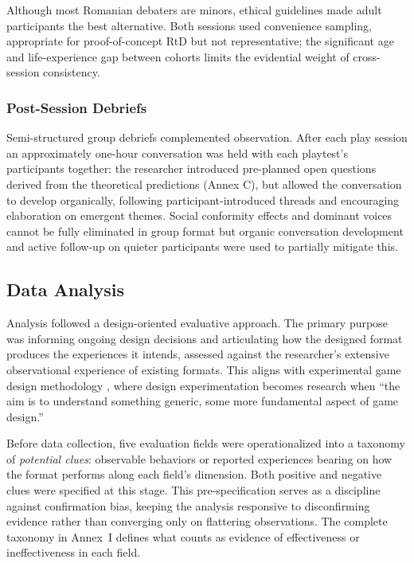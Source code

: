 Although most Romanian debaters are minors, ethical guidelines made adult participants the best alternative. Both sessions used convenience sampling, appropriate for proof-of-concept RtD but not representative; the significant age and life-experience gap between cohorts limits the evidential weight of cross-session consistency.

\subsubsection{Post-Session Debriefs}

Semi-structured group debriefs complemented observation. After each play session an approximately one-hour conversation was held with each playtest's participants together: the researcher introduced pre-planned open questions derived from the theoretical predictions (Annex C), but allowed the conversation to develop organically, following participant-introduced threads and encouraging elaboration on emergent themes. Social conformity effects and dominant voices cannot be fully eliminated in group format but organic conversation development and active follow-up on quieter participants were used to partially mitigate this.

\subsection{Data Analysis}

Analysis followed a design-oriented evaluative approach. The primary purpose was informing ongoing design decisions and articulating how the designed format produces the experiences it intends, assessed against the researcher's extensive observational experience of existing formats. This aligns with experimental game design methodology \parencite{waern2015experimental}, where design experimentation becomes research when ``the aim is to understand something generic, some more fundamental aspect of game design.''

Before data collection, five evaluation fields were operationalized into a taxonomy of \textit{potential clues}: observable behaviors or reported experiences bearing on how the format performs along each field's dimension. Both positive and negative clues were specified at this stage. This pre-specification serves as a discipline against confirmation bias, keeping the analysis responsive to disconfirming evidence rather than converging only on flattering observations. The complete taxonomy in Annex~I defines what counts as evidence of effectiveness or ineffectiveness in each field.

